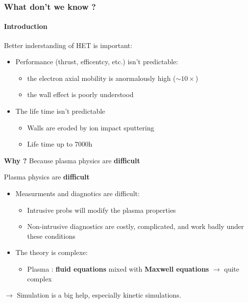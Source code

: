 \documentclass[sans, aspectratio=169]{beamer}
\begin{document}
\begin{frame} 
\frametitle{What don't we know ?} 
\framesubtitle{Introduction} 
Better inderstanding of HET is important:

\begin{itemize}
\item Performance (thrust, efficentcy, etc.) isn't predictable:
	\begin{itemize}
		\item the electron axial mobility is anormalously high ($\sim 10 \times$)
		\item the wall effect is poorly understood
	\end{itemize}
\item The life time isn't predictable
	\begin{itemize}
		\item Walls are eroded by ion impact sputtering
		\item Life time up to 7000h
	\end{itemize}
\end{itemize}

\begin{center}
\textbf{Why ?} \pause Because plasma physics are \textbf{difficult}

\end{center}
\end{frame}

\begin{frame}{Plasma physics are \textbf{difficult}} 

	\begin{itemize}
	\item Measurments and diagnotics are difficult:
		\begin{itemize}
			\item Intrusive probs will modify the plasma properties
			\item Non-intrusive diagnostics are costly, complicated, and work badly under these conditions
		
		\end{itemize}
	\end{itemize}
	\begin{itemize}
	\item The theory is complexe:
		\begin{itemize}
			\item Plasma : \textbf{fluid equations} mixed with \textbf{Maxwell equations} $\rightarrow$ quite complex
		
		\end{itemize}
	\end{itemize}
	$\rightarrow$ Simulation is a big help, especially kinetic simulations.
\end{frame}
\end{document}

